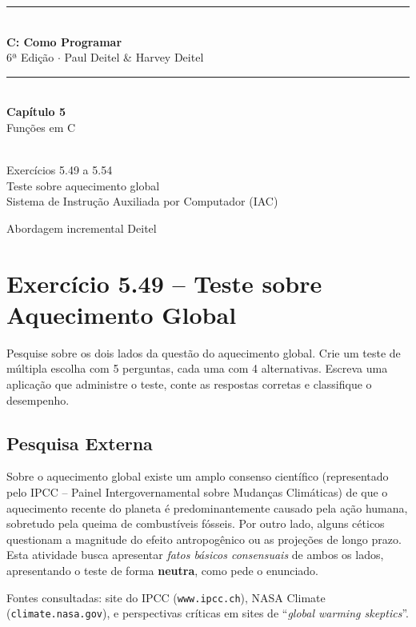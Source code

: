 \documentclass[12pt,a4paper]{article}
\begin{document}
\begin{titlepage}
  \centering\vspace*{2cm}
  {\color{deitelblue}\rule{\linewidth}{2pt}}\\[0.4cm]
  {\huge\bfseries\color{deitelblue}C: Como Programar}\\[0.2cm]
  {\large\color{deitelblue}6ª Edição $\cdot$ Paul Deitel \& Harvey Deitel}\\[0.2cm]
  {\color{deitelblue}\rule{\linewidth}{2pt}}\\[1cm]
  {\LARGE\bfseries Capítulo 5}\\[0.3cm]
  {\Large\color{deitelblue!80}Funções em C}\\[0.8cm]
  \begin{tcolorbox}[colback=ecolightgreen,colframe=ecogreen,width=0.85\linewidth]
    \\[0.3cm]
    {\normalsize Exercícios 5.49 a 5.54\\[0.2cm]
    Teste sobre aquecimento global\\
    Sistema de Instrução Auxiliada por Computador (IAC)}
  \end{tcolorbox}
  \vfill{\small Abordagem incremental Deitel}
\end{titlepage}

\tableofcontents\newpage

\section{Exercício 5.49 -- Teste sobre Aquecimento Global}

\begin{enunciadoBox}[Enunciado 5.49]
Pesquise sobre os dois lados da questão do aquecimento global. Crie um teste de
múltipla escolha com 5 perguntas, cada uma com 4 alternativas. Escreva uma aplicação
que administre o teste, conte as respostas corretas e classifique o desempenho.
\end{enunciadoBox}

\subsection*{Pesquisa Externa}

\begin{pesquisa}
Sobre o aquecimento global existe um amplo consenso científico (representado pelo
IPCC -- Painel Intergovernamental sobre Mudanças Climáticas) de que o aquecimento
recente do planeta é predominantemente causado pela ação humana, sobretudo pela
queima de combustíveis fósseis. Por outro lado, alguns céticos questionam a magnitude
do efeito antropogênico ou as projeções de longo prazo. Esta atividade busca apresentar
\textit{fatos básicos consensuais} de ambos os lados, apresentando o teste de forma
\textbf{neutra}, como pede o enunciado.

Fontes consultadas: site do IPCC (\texttt{www.ipcc.ch}), NASA Climate
(\texttt{climate.nasa.gov}), e perspectivas críticas em sites de ``\textit{global
warming skeptics}''.
\end{pesquisa}
\end{document}
